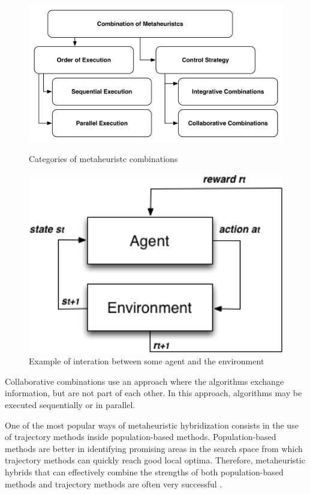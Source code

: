 \begin{figure}[h]
\begin{minipage}{.5\textwidth}
\centering
\includegraphics[width=1\textwidth]{./images/metaheuristc2.png}
\caption{Categories of metaheuristc combinations \cite{Puchinger2005} }
\label{fig:metaheuristc}
\end{minipage}
\begin{minipage}{.5\textwidth}
\centering
\includegraphics[width=1\textwidth]{./images/agentenv.png}
\caption{Example of interation between some agent and the environment}
\label{fig:agentenv}
\end{minipage}
\end{figure}

Collaborative combinations use an approach where the algorithms exchange information, but are not part of each other. In this approach, algorithms may be executed sequentially or in parallel. 

One of the most popular ways of metaheuristic hybridization consists in the use of trajectory methods inside population-based methods. Population-based methods are better in identifying promising areas in the search space from which trajectory methods can quickly reach good local optima. Therefore, metaheuristic hybrids that can effectively combine the strengths of both population-based methods and trajectory methods are often very successful \cite{raidl2010metaheuristic}.


